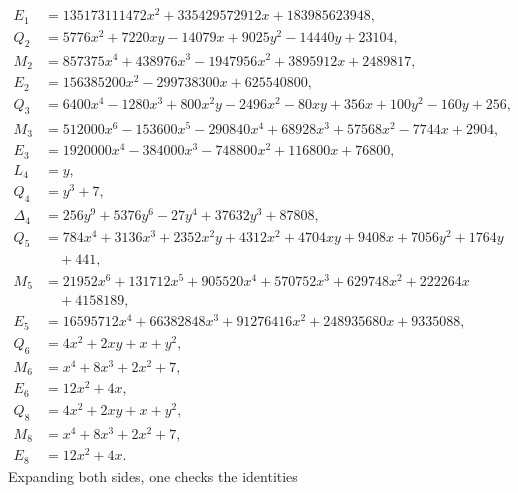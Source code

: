 \documentclass[11pt]{article}
\begin{document}
\begin{align*}
E_{1}&=135173111472x^{2}+335429572912x+183985623948,\\
Q_{2}&=5776x^{2}+7220xy-14079x+9025y^{2}-14440y+23104,\\
M_{2}&=857375x^{4}+438976x^{3}-1947956x^{2}+3895912x+2489817,\\
E_{2}&=156385200x^{2}-299738300x+625540800,\\
Q_{3}&=6400x^{4}-1280x^{3}+800x^{2}y-2496x^{2}-80xy+356x+100y^{2}-160y+256,\\
M_{3}&=512000x^{6}-153600x^{5}-290840x^{4}+68928x^{3}+57568x^{2}-7744x+2904,\\
E_{3}&=1920000x^{4}-384000x^{3}-748800x^{2}+116800x+76800,\\
L_{4}&=y,\\
Q_{4}&=y^{3}+7,\\
\Delta_{4}&=256y^{9}+5376y^{6}-27y^{4}+37632y^{3}+87808,\\
Q_{5}&=784x^{4}+3136x^{3}+2352x^{2}y+4312x^{2}+4704xy+9408x+7056y^{2}+1764y\\
&\quad+441,\\
M_{5}&=21952x^{6}+131712x^{5}+905520x^{4}+570752x^{3}+629748x^{2}+222264x\\
&\quad+4158189,\\
E_{5}&=16595712x^{4}+66382848x^{3}+91276416x^{2}+248935680x+9335088,\\
Q_{6}&=4x^{2}+2xy+x+y^{2},\\
M_{6}&=x^{4}+8x^{3}+2x^{2}+7,\\
E_{6}&=12x^{2}+4x,\\
Q_{8}&=4x^{2}+2xy+x+y^{2},\\
M_{8}&=x^{4}+8x^{3}+2x^{2}+7,\\
E_{8}&=12x^{2}+4x.
\end{align*}
Expanding both sides, one checks the identities
\end{document}
